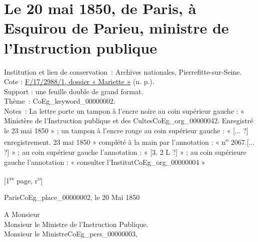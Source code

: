 \documentclass{book}
\begin{document}
\hypertarget{CoEg_Mariette_1850-05-20}{}

\section*{Le 20 mai 1850, de Paris, à Esquirou de Parieu, ministre de l’Instruction publique}
 \label{labCoEg_Mariette_1850-05-20}
{\footnotesize
\noindent Institution et lieu de conservation~: Archives nationales, Pierrefitte-sur-Seine.\\
Cote : \hyperlink{CoEg_Mariette_ms_002}{F/17/2988/1, dossier « Mariette »} (n. p.).\\
Support : une feuille double de grand format.\\
Thème~: \gls{CoEg_keyword_00000002}.\\
Notes~: La lettre porte un tampon à l’encre noire au coin supérieur gauche : « Ministère de l’Instruction publique et des Cultes\gls{CoEg_org_00000042}. Enregistré le 23 mai 1850 » ; un tampon à l’encre rouge au coin supérieur gauche : « [... ?] enregistrement. 23 mai 1850 » complété à la main par l’annotation : « n\textsuperscript{o} 2067.[... ?] » ; au coin supérieur gauche l’annotation : « [3. 2 L ?] » ; au coin supérieure gauche l’annotation : « consulter l’Institut\gls{CoEg_org_00000004} »}

{\footnotesize \begin{center} {[1\textsuperscript{re} page, r\textsuperscript{o}]}\end{center}}
\begin{flushright}Paris\gls{CoEg_place_00000002}, le 20 Mai 1850\end{flushright}
\indent A Monsieur\\
\indent Monsieur le Ministre de l’Instruction Publique.\\

\indent Monsieur le Ministre\gls{CoEg_pers_00000003},\\
\end{document}
